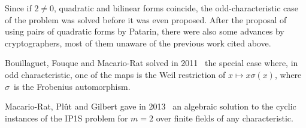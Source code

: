\documentclass{lms}
\def\F{\mathbb{F}}
\begin{document}
% 
Since if $2 ≠ 0$, quadratic and bilinear forms coincide,
the odd-characteristic case of the problem
was solved before it was even proposed.
After the proposal of using pairs of quadratic forms by Patarin,
there were also some advances by cryptographers,
most of them unaware of the previous work cited above.

Bouillaguet, Fouque and Macario-Rat solved
in 2011~\cite{DBLP:conf/asiacrypt/BouillaguetFM11}
the special case where, in odd characteristic,
one of the maps is the Weil restriction of $x ↦ x σ(x)$,
where $σ$~is the Frobenius automorphism.

Macario-Rat, Plût and Gilbert gave in 2013~\cite{MPG2013}
an algebraic solution to the cyclic instances of the IP1S problem
for $m=2$ over finite fields of any characteristic.
\end{document}
